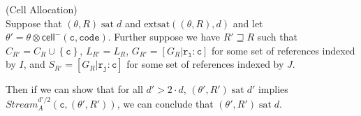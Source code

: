 \documentclass[preprint]{sigplanconf}
\newcommand{\setof}[1]{\left\{{#1}\right\}}
\newcommand{\term}[1]{\ensuremath{\mathtt{{#1}}}}
\newcommand{\Stream}{\mathit{Stream}}
\newcommand{\cellminus}[2]{\mathsf{cell}^{-}({#1}, {#2})}
\newcommand{\satisfy}[2]{{#1}\;\mathrm{sat}\;{#2}}
\newcommand{\satisfyext}[2]{\mathrm{extsat}({#1}, {#2})}
\begin{document}
\begin{lemma}{(Cell Allocation)} \\
Suppose that $\satisfy{(\theta, R)}{d}$ and
$\satisfyext{(\theta,R)}{d}$ and let $\theta' = \theta \otimes
\cellminus{\term{c}}{\term{code}}$. Further suppose we have $R'
\sqsupseteq R$ such that $C_{R'} = C_R \cup \setof{\term{c}}$, $L_{R'}
= L_R$, $G_{R'} = [G_R | \term{r_i : c}]$ for some set of references
indexed by $I$, and $S_{R'} = [G_R | \term{r_j : c}]$ for some set of
references indexed by $J$.

Then if we can show that for all $d' > 2 \cdot d$,
$\satisfy{(\theta',R')}{d'}$ implies $\Stream^{d'/2}_A(\term{c},
(\theta', R'))$, we can conclude that $\satisfy{(\theta',R')}{d}$. 

\end{lemma}
\end{document}
